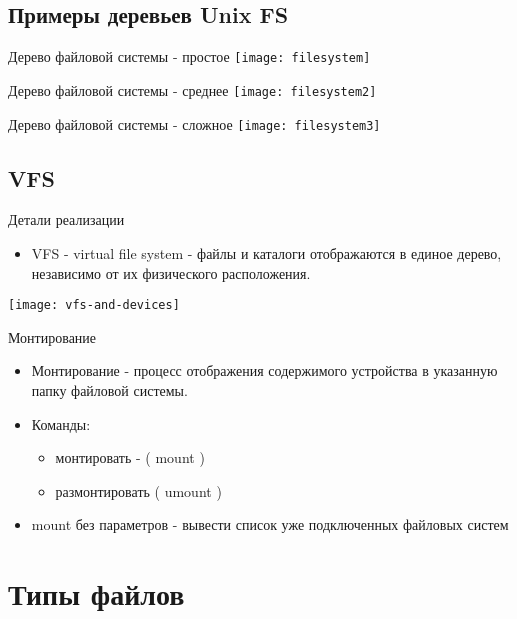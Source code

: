 \subsection{Примеры деревьев Unix FS}

\begin{frame}{Дерево файловой системы - простое}
\texttt{[image: filesystem]} 
\end{frame}

\begin{frame}{Дерево файловой системы - среднее}
\texttt{[image: filesystem2]} 
\end{frame}

\begin{frame}{Дерево файловой системы - сложное}
\texttt{[image: filesystem3]} 
\end{frame}

\subsection{VFS}

\begin{frame}{Детали реализации}
  \begin{itemize}
    \item \alert{VFS - virtual file system} - файлы и каталоги отображаются в единое дерево, независимо от их физического расположения.
  \end{itemize}
  \texttt{[image: vfs-and-devices]}
\end{frame}

\begin{frame}{Монтирование}
  \begin{itemize}
    \item \alert{Монтирование} - процесс отображения содержимого устройства в указанную папку файловой системы.
    \item Команды:
      \begin{itemize}
	\item монтировать - ( \alert{mount} ) 
	\item размонтировать ( \alert{umount} )
      \end{itemize}
    \item \alert{mount} без параметров - вывести список уже подключенных файловых систем
  \end{itemize}
  
\end{frame}

\section{Типы файлов}

